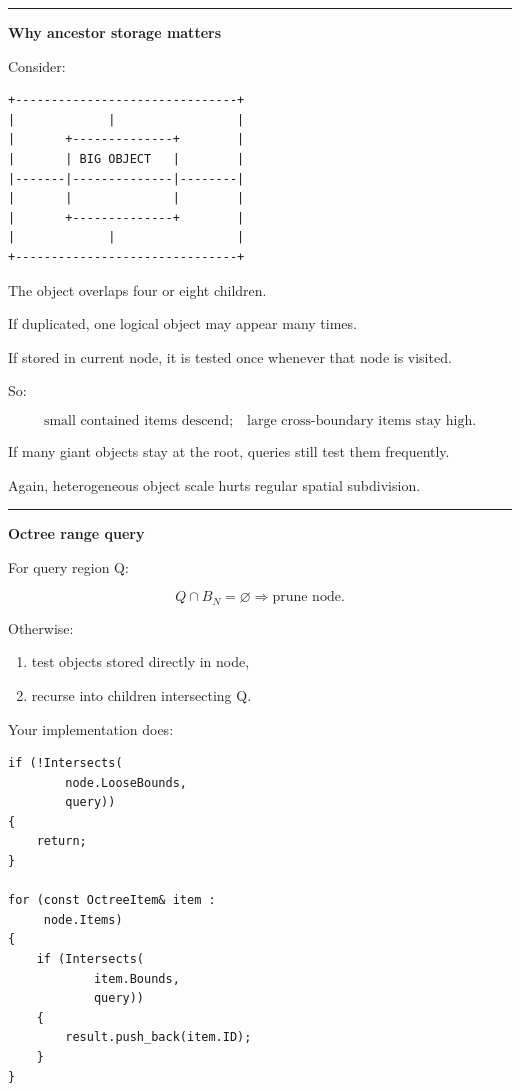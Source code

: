\begin{center}\rule{0.5\linewidth}{0.5pt}\end{center}

\textbf{Why ancestor storage matters}

Consider:

\begin{verbatim}
+-------------------------------+
|             |                 |
|       +--------------+        |
|       | BIG OBJECT   |        |
|-------|--------------|--------|
|       |              |        |
|       +--------------+        |
|             |                 |
+-------------------------------+
\end{verbatim}

The object overlaps four or eight children.

If duplicated, one logical object may appear many times.

If stored in current node, it is tested once whenever that node is visited.

So:

\[
\boxed{
\text{small contained items descend;}
\quad
\text{large cross-boundary items stay high}.
}
\]

If many giant objects stay at the root, queries still test them frequently.

Again, heterogeneous object scale hurts regular spatial subdivision.

\begin{center}\rule{0.5\linewidth}{0.5pt}\end{center}

\textbf{Octree range query}

For query region Q:

\[
Q\cap B_N=\varnothing
\Rightarrow
\text{prune node}.
\]

Otherwise:

\begin{enumerate}
\def\labelenumi{\arabic{enumi}.}
\tightlist
\item
  test objects stored directly in node,
\item
  recurse into children intersecting Q.
\end{enumerate}

Your implementation does:

\begin{verbatim}
if (!Intersects(
        node.LooseBounds,
        query))
{
    return;
}

for (const OctreeItem& item :
     node.Items)
{
    if (Intersects(
            item.Bounds,
            query))
    {
        result.push_back(item.ID);
    }
}
\end{verbatim}


